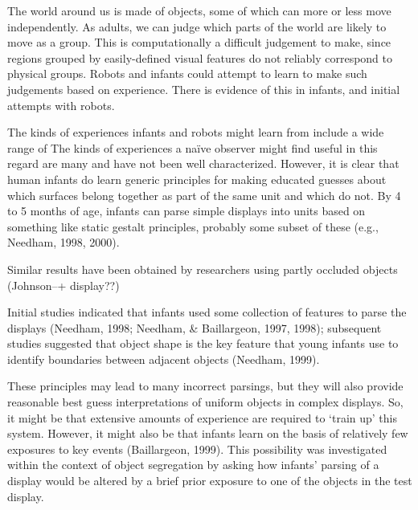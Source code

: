 

The world around us is made of objects, some of which can more or less
move independently. As adults, we can judge which parts of the world
are likely to move as a group. This is computationally a difficult
judgement to make, since regions grouped by easily-defined visual
features do not reliably correspond to physical groups. Robots and
infants could attempt to learn to make such judgements based on
experience. There is evidence of this in infants, and initial attempts
with robots.


The kinds of experiences infants and robots might learn from include a
wide range of The kinds of experiences a na\"{i}ve observer might find
useful in this regard are many and have not been well characterized.
However, it is clear that human infants do learn generic principles
for making educated guesses about which surfaces belong together as
part of the same unit and which do not.  By 4 to 5 months of age,
infants can parse simple displays into units based on something like
static gestalt principles, probably some subset of these (e.g.,
Needham, 1998, 2000).

Similar results have been obtained by researchers using partly
occluded objects (Johnson--+ display??)



Initial studies indicated that infants used some collection of
features to parse the displays (Needham, 1998; Needham, \& Baillargeon,
1997, 1998); subsequent studies suggested that object shape is the key
feature that young infants use to identify boundaries between adjacent
objects (Needham, 1999).



These principles may lead to many incorrect parsings, but they will
also provide reasonable best guess interpretations of uniform objects
in complex displays.  So, it might be that extensive amounts of
experience are required to `train up' this system.
However, it might also be that infants learn on the basis of
relatively few exposures to key events (Baillargeon, 1999).  This
possibility was investigated within the context of object segregation
by asking how infants' parsing of a display would be altered
by a brief prior exposure to one of the objects in the test display.



